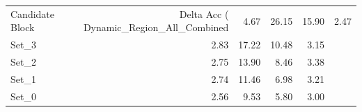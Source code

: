 \begin{tabular}{lrrrr}
\toprule
Candidate Block & Delta Acc (%
\midrule
Dynamic_Region_All_Combined & 4.67 & 26.15 & 15.90 & 2.47 \\
Set_3 & 2.83 & 17.22 & 10.48 & 3.15 \\
Set_2 & 2.75 & 13.90 & 8.46 & 3.38 \\
Set_1 & 2.74 & 11.46 & 6.98 & 3.21 \\
Set_0 & 2.56 & 9.53 & 5.80 & 3.00 \\
\bottomrule
\end{tabular}
